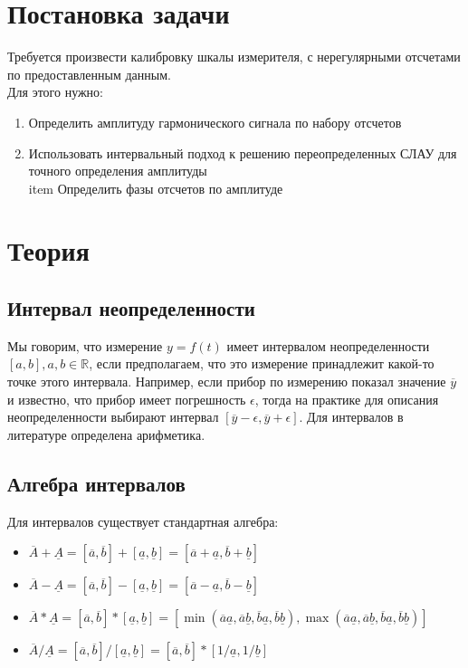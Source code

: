 \documentclass[a4paper]{article}
\begin{document}
    
    \tableofcontents
    \newpage
    \listoffigures
    \newpage
    \section{Постановка задачи}
    Требуется произвести калибровку шкалы измерителя, с нерегулярными отсчетами по предоставленным данным.\\
    Для этого нужно:
\begin{enumerate}
    \item Определить амплитуду гармонического сигнала по набору отсчетов
    \item Использовать интервальный подход к решению переопределенных СЛАУ для точного определения амплитуды
    \\item Определить фазы отсчетов по амплитуде
\end{enumerate}

\section{Теория}
    \subsection{Интервал неопределенности}
        Мы говорим, что измерение $y = f(t)$ имеет интервалом неопределенности $[a, b], a, b \in \mathbb{R}$, если предполагаем, что это измерение принадлежит какой-то точке этого интервала. Например, если прибор по
        измерению показал значение $\overline{y}$ и известно, что прибор имеет погрешность $\epsilon$, тогда на практике для
        описания неопределенности выбирают интервал $[\overline{y} - \epsilon, \overline{y} + \epsilon]$. Для интервалов в литературе определена
        арифметика.\cite{Bazhenov}
    \subsection{Алгебра интервалов}
        Для интервалов существует стандартная алгебра:
        \begin{itemize}
            \item $\overline{A}+\underline{A}=[\overline{a},\overline{b}]+[\underline{a},\underline{b}]=[\overline{a}+\underline{a},\overline{b}+\underline{b}]$
            \item $\overline{A}-\underline{A}=[\overline{a},\overline{b}]-[\underline{a},\underline{b}]=[\overline{a}-\underline{a},\overline{b}-\underline{b}]$
            \item $\overline{A}*\underline{A}=[\overline{a},\overline{b}]*[\underline{a},\underline{b}]=[\min(\overline{a}\underline{a},\overline{a}\underline{b},\overline{b}\underline{a},\overline{b}\underline{b}),\max(\overline{a}\underline{a},\overline{a}\underline{b},\overline{b}\underline{a},\overline{b}\underline{b})]$
            \item $\overline{A}/\underline{A}=[\overline{a},\overline{b}]/[\underline{a},\underline{b}]=[\overline{a},\overline{b}]*[1 / \underline{a},1 / \underline{b}]$
        \end{itemize}
\end{document}

